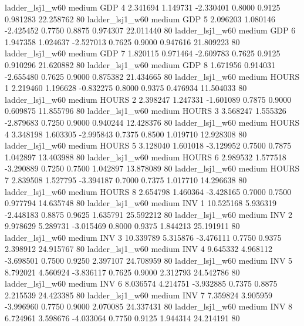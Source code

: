        ladder_lsj1_w60     medium      GDP                 4  2.341694 1.149731 -2.330401 0.8000 0.9125  0.981283   22.258762 80
       ladder_lsj1_w60     medium      GDP                 5  2.096203 1.080146 -2.425452 0.7750 0.8875  0.974307   22.011440 80
       ladder_lsj1_w60     medium      GDP                 6  1.947358 1.024637 -2.527013 0.7625 0.9000  0.947616   21.809223 80
       ladder_lsj1_w60     medium      GDP                 7  1.820115 0.971464 -2.609783 0.7625 0.9125  0.910296   21.620882 80
       ladder_lsj1_w60     medium      GDP                 8  1.671956 0.914031 -2.655480 0.7625 0.9000  0.875382   21.434665 80
       ladder_lsj1_w60     medium    HOURS                 1  2.219460 1.196628 -0.832275 0.8000 0.9375  0.476934   11.504033 80
       ladder_lsj1_w60     medium    HOURS                 2  2.398247 1.247331 -1.601089 0.7875 0.9000  0.609875   11.855796 80
       ladder_lsj1_w60     medium    HOURS                 3  3.568247 1.555326 -2.879683 0.7250 0.9000  0.940244   12.428376 80
       ladder_lsj1_w60     medium    HOURS                 4  3.348198 1.603305 -2.995843 0.7375 0.8500  1.019710   12.928308 80
       ladder_lsj1_w60     medium    HOURS                 5  3.128040 1.601018 -3.129952 0.7500 0.7875  1.042897   13.403988 80
       ladder_lsj1_w60     medium    HOURS                 6  2.989532 1.577518 -3.290889 0.7250 0.7500  1.042897   13.878089 80
       ladder_lsj1_w60     medium    HOURS                 7  2.839508 1.527795 -3.394187 0.7000 0.7375  1.017710   14.296638 80
       ladder_lsj1_w60     medium    HOURS                 8  2.654798 1.460364 -3.428165 0.7000 0.7500  0.977794   14.635748 80
       ladder_lsj1_w60     medium      INV                 1 10.525168 5.936319 -2.448183 0.8875 0.9625  1.635791   25.592212 80
       ladder_lsj1_w60     medium      INV                 2  9.978629 5.289731 -3.015469 0.8000 0.9375  1.844213   25.191911 80
       ladder_lsj1_w60     medium      INV                 3 10.339789 5.315876 -3.476111 0.7750 0.9375  2.398912   24.915767 80
       ladder_lsj1_w60     medium      INV                 4  9.645332 4.968112 -3.698501 0.7500 0.9250  2.397107   24.708959 80
       ladder_lsj1_w60     medium      INV                 5  8.792021 4.560924 -3.836117 0.7625 0.9000  2.312793   24.542786 80
       ladder_lsj1_w60     medium      INV                 6  8.036574 4.214751 -3.932885 0.7375 0.8875  2.215539   24.423385 80
       ladder_lsj1_w60     medium      INV                 7  7.359824 3.905959 -3.996960 0.7750 0.9000  2.070085   24.337431 80
       ladder_lsj1_w60     medium      INV                 8  6.724961 3.598676 -4.033064 0.7750 0.9125  1.944314   24.214191 80
